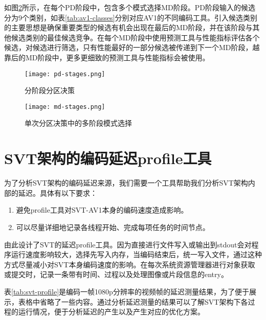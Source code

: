   如图\ref{fig:md}所示，在每个PD阶段中，包含多个模式选择MD阶段。PD阶段输入的候选分为9个类别，如表\ref{tab:av1-classes}分别对应AV1的不同编码工具。引入候选类别的主要思想是确保重要类型的候选有机会出现在最后的MD阶段，并在该阶段与其他候选类别的最佳候选竞争。在每个MD阶段中使用预测工具与性能指标评估各个候选，对候选进行筛选，只有性能最好的一部分候选被传递到下一个MD阶段，越靠后的MD阶段中，更多更细致的预测工具与性能指标会被使用。



  \begin{figure}[!htp]
    \centering
    \texttt{[image: pd-stages.png]}
    \caption{分阶段分区决策}
  \label{fig:pd}
  \end{figure}

  \begin{figure}[!htp]
    \centering
    \texttt{[image: md-stages.png]}
    \caption{单次分区决策中的多阶段模式选择}
  \label{fig:md}
  \end{figure}
\section{SVT架构的编码延迟profile工具} \label{sec:svt-profile}
  为了分析SVT架构的编码延迟来源，我们需要一个工具帮助我们分析SVT架构内部的延迟。具体有以下要求：
  \begin{enumerate} [label=\arabic*)]
    \item 避免profile工具对SVT-AV1本身的编码速度造成影响。
    \item 可以尽量详细地记录各线程开始、完成每项任务的时间节点。
  \end{enumerate}

  由此设计了SVT的延迟profile工具。因为直接进行文件写入或输出到stdout会对程序运行速度影响较大，选择先写入内存，当编码结束后，统一写入文件，通过这种方式尽量减小对SVT本身编码速度的影响。在每次系统资源管理器进行对象获取或提交时，记录一条带有时间、过程以及处理图像或片段信息的entry。

  表\ref{tab:svt-profile}是编码一帧1080p分辨率的视频帧的延迟测量结果，为了便于展示，表格中省略了一些内容。通过分析延迟测量的结果可以了解SVT架构下各过程的运行情况，便于分析延迟的产生以及产生对应的优化方案。

